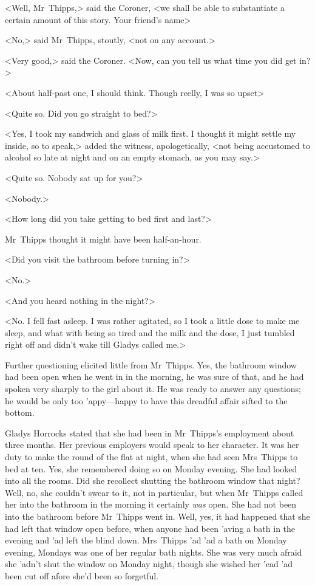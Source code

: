 <Well, Mr~Thipps,> said the Coroner, <we shall be able to substantiate a certain amount of this story. Your friend's name\longdash>

<No,> said Mr~Thipps, stoutly, <not on any account.>

<Very good,> said the Coroner. <Now, can you tell us what time you did get in?>

<About half-past one, I should think. Though reelly, I was so upset\longdash>

<Quite so. Did you go straight to bed?>

<Yes, I took my sandwich and glass of milk first. I thought it might settle my inside, so to speak,> added the witness, apologetically, <not being accustomed to alcohol so late at night and on an empty stomach, as you may say.>

<Quite so. Nobody sat up for you?>

<Nobody.>

<How long did you take getting to bed first and last?>

Mr~Thipps thought it might have been half-an-hour.

<Did you visit the bathroom before turning in?>

<No.>

<And you heard nothing in the night?>

<No. I fell fast asleep. I was rather agitated, so I took a little dose to make me sleep, and what with being so tired and the milk and the dose, I just tumbled right off and didn't wake till Gladys called me.>

Further questioning elicited little from Mr~Thipps. Yes, the bathroom window had been open when he went in in the morning, he was sure of that, and he had spoken very sharply to the girl about it. He was ready to answer any questions; he would be only too 'appy—happy to have this dreadful affair sifted to the bottom.

Gladys Horrocks stated that she had been in Mr~Thipps's employment about three months. Her previous employers would speak to her character. It was her duty to make the round of the flat at night, when she had seen Mrs~Thipps to bed at ten. Yes, she remembered doing so on Monday evening. She had looked into all the rooms. Did she recollect shutting the bathroom window that night? Well, no, she couldn't swear to it, not in particular, but when Mr~Thipps called her into the bathroom in the morning it certainly \textit{was} open. She had not been into the bathroom before Mr~Thipps went in. Well, yes, it had happened that she had left that window open before, when anyone had been 'aving a bath in the evening and 'ad left the blind down. Mrs~Thipps 'ad 'ad a bath on Monday evening, Mondays was one of her regular bath nights. She was very much afraid she 'adn't shut the window on Monday night, though she wished her 'ead 'ad been cut off afore she'd been so forgetful.

